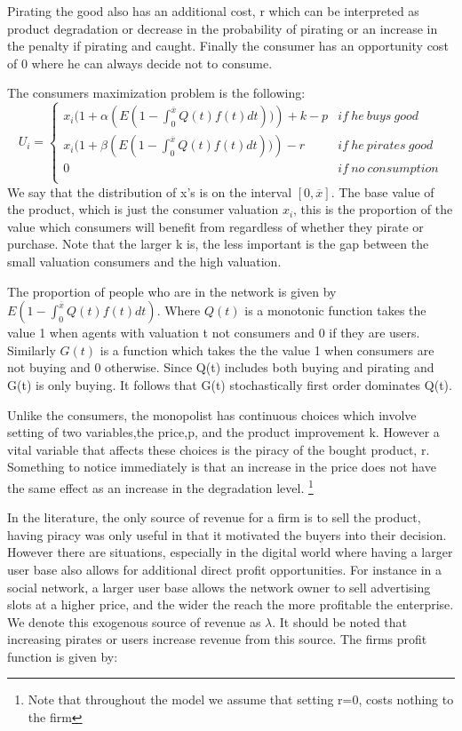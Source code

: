 \documentclass{article}
\begin{document}
Pirating the good also has an additional cost, r which can be interpreted as product degradation or decrease in the probability of pirating or an increase in the penalty if pirating and caught. Finally the consumer has an opportunity cost of 0 where he can always decide not to consume. 

The consumers maximization problem is the following:
\[
U_i= \left\{
                \begin{array}{ll}
                  x_i(1+\alpha \left(E(1 - \int^{\overline{x}}_{0}Q(t)f(t)dt)) \right) + k -p  & if ~ he ~ buys ~ good  \\
                  x_i(1+\beta \left(E(1 - \int^{\overline{x}}_{0}Q(t)f(t)dt)) \right) -r &  if ~ he ~ pirates ~ good \\
									0 & if ~ no ~ consumption  \\ 
                \end{array}
\right.
\]
We say that the distribution of x's is on the interval $[0,\overline{x}]$. The base value of the product, which is just the consumer valuation $x_i$, this is the proportion of the value which consumers will benefit from regardless of whether they pirate or purchase. Note that the larger k is, the less important is the gap between the small valuation consumers and the high valuation. 

The proportion of people who are in the network is given by $E(1 - \int^{\overline{x}}_{0}Q(t)f(t)dt) $. Where $Q(t)$ is a monotonic function takes the value 1 when agents with valuation t not consumers and 0 if they are users. Similarly $G(t)$ is a function which takes the the value 1 when consumers are not buying and 0 otherwise. Since Q(t) includes both buying and pirating and G(t) is only buying. It follows that G(t) stochastically first order dominates Q(t). 

Unlike the consumers, the monopolist has continuous choices which involve setting of two variables,the price,p, and the product improvement k. However a vital variable that affects these choices is the piracy of the bought product, r. Something to notice immediately is that an increase in the price does not have the same effect as an increase in the degradation level. \footnote{Note that throughout the model we assume that setting r=0, costs nothing to the firm }

In the literature, the only source of revenue for a firm is to sell the product, having piracy was only useful in that it motivated the buyers into their decision. However there are situations, especially in the digital world where having a larger user base also allows for additional direct profit opportunities. For instance in a social network, a larger user base allows the network owner to sell advertising slots at a higher price, and the wider the reach the more profitable the enterprise. We denote this exogenous source of revenue as $\lambda$. It should be noted that increasing pirates or users increase revenue from this source.  The firms profit function is given by:
\end{document}

